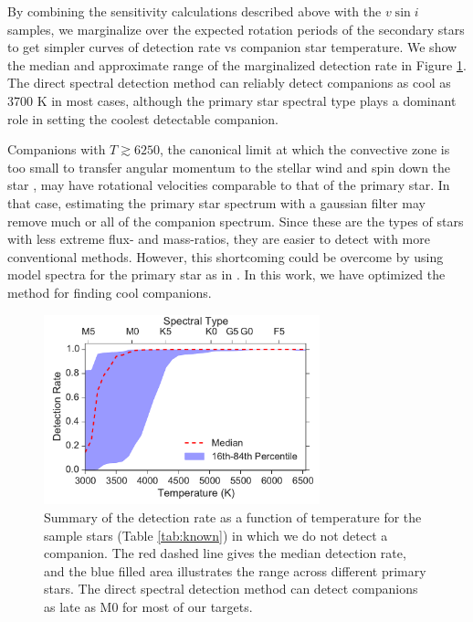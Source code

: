 \documentclass{emulateapj}
\begin{document}
By combining the sensitivity calculations described above with the $v\sin{i}$ samples, we marginalize over the expected rotation periods of the secondary stars to get simpler curves of detection rate vs companion star temperature. We show the median and approximate range of the marginalized detection rate in Figure \ref{fig:sensitivity}. The direct spectral detection method can reliably detect companions as cool as 3700 K in most cases, although the primary star spectral type plays a dominant role in setting the coolest detectable companion. 

Companions with $T \gtrsim 6250$, the canonical limit at which the convective zone is too small to transfer angular momentum to the stellar wind and spin down the star \citep{Pinsonneault2001}, may have rotational velocities comparable to that of the primary star. In that case, estimating the primary star spectrum with a gaussian filter may remove much or all of the companion spectrum. Since these are the types of stars with less extreme flux- and mass-ratios, they are easier to detect with more conventional methods. However, this shortcoming could be overcome by using model spectra for the primary star as in \citet{Kolbl2015}. In this work, we have optimized the method for finding cool companions.


\begin{figure}
        \centering
        \includegraphics[width=80mm]{DetectionRate.pdf}

         \caption{Summary of the detection rate as a function of temperature for the sample stars (Table \ref{tab:known}) in which we do not detect a companion. The red dashed line gives the median detection rate, and the blue filled area illustrates the range across different primary stars. The direct spectral detection method can detect companions as late as M0 for most of our targets.}
         \label{fig:sensitivity}
\end{figure}
\end{document}
